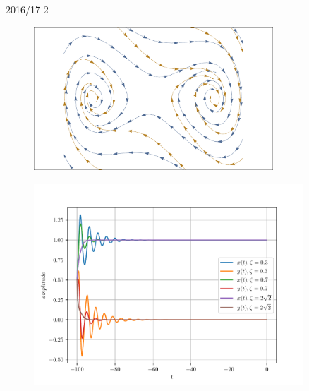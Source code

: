 \begin{solution}{2016/17 2}
\begin{figure}[h!]
        \caption{}
        \label{fig:ex2_dampedDuffing07Vec}
    \end{figure}
    \begin{figure}[h!]
        \centering
        \includegraphics[width=0.8\textwidth]{figures/ex2_dampedDuffing0307Vec.pdf}
        \caption{}
        \label{fig:ex2_dampedDuffing0307Vec}
    \end{figure}
    \begin{figure}[h!]
        \centering
        \includegraphics[width=0.9\textwidth]{figures/ex2_dampedDuffing.pdf}
        \caption{}
        \label{fig:ex2_dampedDuffing}
    \end{figure}
\end{solution}
